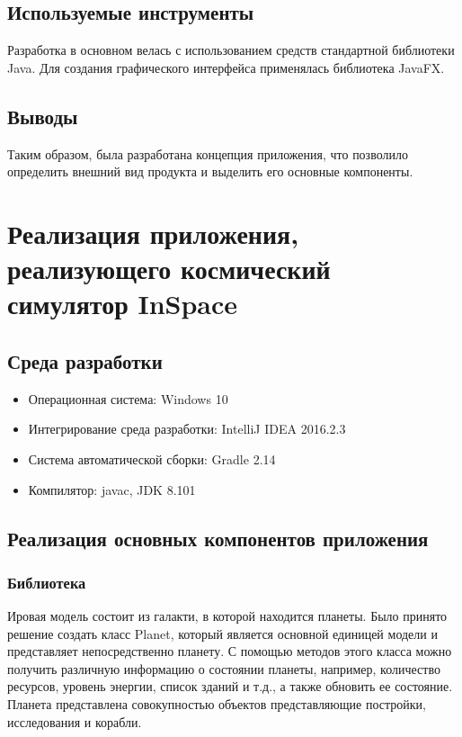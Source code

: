\subsection{Используемые инструменты}

Разработка в основном велась с использованием средств стандартной библиотеки Java. Для создания графического интерфейса применялась библиотека JavaFX.

\subsection{Выводы}
Таким образом, была разработана концепция приложения, что позволило определить внешний вид продукта и выделить его основные компоненты.

\section{Реализация приложения, реализующего космический симулятор InSpace}

\subsection{Среда разработки}

\begin{itemize}
	\item Операционная система: Windows 10
	\item Интегрирование среда разработки: IntelliJ IDEA 2016.2.3
	\item Система автоматической сборки: Gradle 2.14
	\item Компилятор: javac, JDK 8.101
\end{itemize}

\subsection{Реализация основных компонентов приложения}

\subsubsection{Библиотека}

Ировая модель состоит из галакти, в которой находится планеты. Было принято решение создать класс Planet, который является основной единицей модели и представляет непосредственно планету. С помощью методов этого класса можно получить различную информацию о состоянии планеты, например, количество ресурсов, уровень энергии, список зданий и т.д., а также обновить ее состояние. Планета представлена совокупностью объектов представляющие постройки, исследования и корабли.

